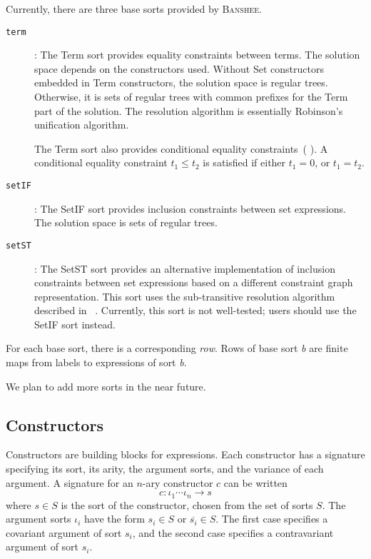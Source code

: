 \documentclass{article}
\newcommand{\banshee}{\textsc{Banshee}}
\newcommand{\Term}{\textsf{Term}}
\newcommand{\Set}{\textsf{Set}}
\newcommand{\SetIF}{\textsf{SetIF}}
\newcommand{\SetST}{\textsf{SetST}}
\newcommand{\contra}[1]{\overline{#1}}
\begin{document}
Currently, there are three base sorts provided by \banshee{}.
\begin{description}
 	\item[\texttt{term}]: The \Term{} sort provides equality
        constraints between terms. The solution space depends on the
        constructors used. Without \Set{} constructors embedded in
        \Term{} constructors, the solution space is regular
        trees. Otherwise, it is sets of regular trees with common
        prefixes for the \Term{} part of the solution. The resolution
        algorithm is essentially Robinson's unification algorithm.
  	
	The \Term{} sort also provides conditional equality
        constraints~(\cite{steensgaard:popl96} \cite{henglein:lfp92}). 
	A conditional equality
        constraint $t_1 \leq t_2$ is satisfied if either $t_1 = 0$, or
        $t_1 = t_2$. 

	\item[\texttt{setIF}]: The \SetIF{} sort provides inclusion
        constraints between set expressions. The solution space is
        sets of regular trees. 

	\item[\texttt{setST}]: The \SetST{} sort provides an alternative
        implementation of inclusion constraints between set expressions based 
	on a different constraint graph representation. This sort uses 
	the sub-transitive resolution algorithm described in ~\cite{heintze:pldi01}. Currently, this sort is not well-tested; users should use the \SetIF{} sort instead.
\end{description}

For each base sort, there is a corresponding \textit{row}. Rows of base sort
\textit{b} are finite maps from labels to expressions of sort \textit{b}.

We plan to add more sorts in the near future.

\subsection{Constructors}

Constructors are building blocks for expressions. Each constructor has
a signature specifying its sort, its arity, the argument sorts, and the 
variance of each argument.  A signature for an $n$-ary constructor $c$ can be 
written
$$
   c : \iota_1 \cdots \iota_n \rightarrow s
$$
where $s\in S$ is the sort of the constructor, chosen from the set of
sorts $S$. The argument sorts $\iota_i$ have the form $s_i\in S$ or
$\contra{s_i}\in S$. The first case specifies a covariant argument of
sort $s_i$, and the second case specifies a contravariant argument of
sort $s_i$.
\end{document}
